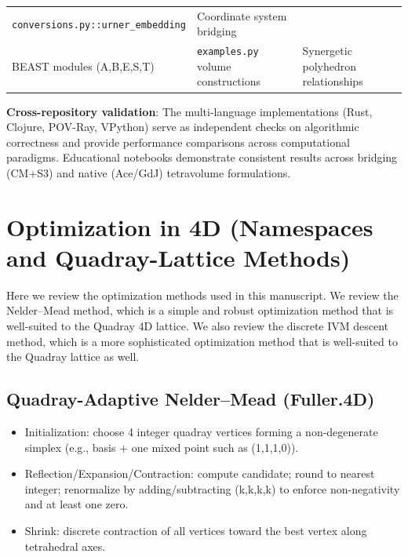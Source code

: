 \documentclass[
  10pt,
]{article}
\providecommand{\tightlist}{%
  \setlength{\itemsep}{0pt}\setlength{\parskip}{0pt}}
\begin{document}
\begin{longtable}[]{@{}lll@{}}
\begin{minipage}[t]{0.35\columnwidth}
\texttt{conversions.py::urner\_embedding}\strut
\end{minipage} & \begin{minipage}[t]{0.26\columnwidth}\raggedright
Coordinate system bridging\strut
\end{minipage}\tabularnewline
\begin{minipage}[t]{0.30\columnwidth}\raggedright
BEAST modules (A,B,E,S,T)\strut
\end{minipage} & \begin{minipage}[t]{0.35\columnwidth}\raggedright
\texttt{examples.py} volume constructions\strut
\end{minipage} & \begin{minipage}[t]{0.26\columnwidth}\raggedright
Synergetic polyhedron relationships\strut
\end{minipage}\tabularnewline
\bottomrule
\end{longtable}

\textbf{Cross-repository validation}: The multi-language implementations
(Rust, Clojure, POV-Ray, VPython) serve as independent checks on
algorithmic correctness and provide performance comparisons across
computational paradigms. Educational notebooks demonstrate consistent
results across bridging (CM+S3) and native (Ace/GdJ) tetravolume
formulations. 

\hypertarget{optimization-in-4d-namespaces-and-quadray-lattice-methods}{%
\section{Optimization in 4D (Namespaces and Quadray-Lattice
Methods)}\label{optimization-in-4d-namespaces-and-quadray-lattice-methods}}

Here we review the optimization methods used in this manuscript. We
review the Nelder--Mead method, which is a simple and robust
optimization method that is well-suited to the Quadray 4D lattice. We
also review the discrete IVM descent method, which is a more
sophisticated optimization method that is well-suited to the Quadray
lattice as well.

\hypertarget{quadray-adaptive-neldermead-fuller.4d}{%
\subsection{Quadray-Adaptive Nelder--Mead
(Fuller.4D)}\label{quadray-adaptive-neldermead-fuller.4d}}

\begin{itemize}
\tightlist
\item
  Initialization: choose 4 integer quadray vertices forming a
  non-degenerate simplex (e.g., basis + one mixed point such as
  (1,1,1,0)).
\item
  Reflection/Expansion/Contraction: compute candidate; round to nearest
  integer; renormalize by adding/subtracting (k,k,k,k) to enforce
  non-negativity and at least one zero.
\item
  Shrink: discrete contraction of all vertices toward the best vertex
  along tetrahedral axes.
\end{itemize}
\end{document}
